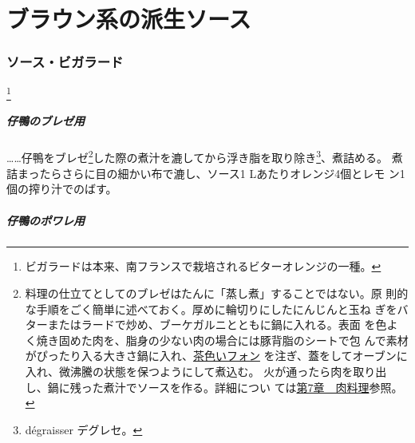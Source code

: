 \hypertarget{petites-sauces-brunes-composees}{%
\section{ブラウン系の派生ソース}\label{petites-sauces-brunes-composees}}


\begin{recette}
\hypertarget{sauce-bigarade}{%
\subsubsection{ソース・ビガラード}\label{sauce-bigarade}}

\footnote{ビガラードは本来、南フランスで栽培されるビターオレンジの一種。}


\hypertarget{sauce-bigarade-pour-caneton-braise}{%
\subparagraph{仔鴨のブレゼ用}\label{sauce-bigarade-pour-caneton-braise}}

\ldots{}\ldots{}仔鴨をブレゼ\footnote{料理の仕立てとしてのブレゼはたんに「蒸し煮」することではない。原
  則的な手順をごく簡単に述べておく。厚めに輪切りにしたにんじんと玉ね
  ぎをバターまたはラードで炒め、ブーケガルニとともに鍋に入れる。表面
  を色よく焼き固めた肉を、脂身の少ない肉の場合には豚背脂のシートで包
  んで素材がぴったり入る大きさ鍋に入れ、\protect\hyperlink{fonds-brun}{茶色いフォン}
  を注ぎ、蓋をしてオーブンに入れ、微沸騰の状態を保つようにして煮込む。
  火が通ったら肉を取り出し、鍋に残った煮汁でソースを作る。詳細につい
  ては\protect\hyperlink{}{第7章　肉料理}参照。}した際の煮汁を漉してから浮き脂を取り除き\footnote{dégraisser
  デグレセ。}、煮詰める。 煮詰まったらさらに目の細かい布で漉し、ソース1
Lあたりオレンジ4個とレモ ン1個の搾り汁でのばす。

\hypertarget{sauce-bigarade-pour-caneton-poele}{%
\subparagraph{仔鴨のポワレ用}\label{sauce-bigarade-pour-caneton-poele}}


\end{recette}
